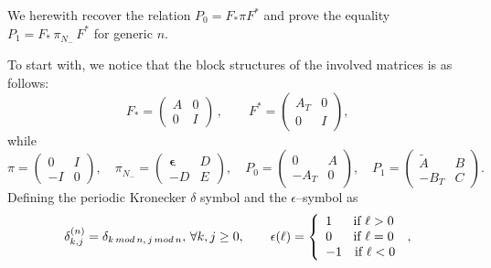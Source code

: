 \documentclass[12pt]{article}
\newcommand{\den}[2]{{{\delta^{(n)}_{#1,#2}}}}
\begin{document}
We herewith recover the relation $P_0=F_*\pi F^*$ and prove the equality $P_1=F_*\,\pi_{N_-}^{\phantom{\sharp}}\, F^*$ for generic $n$.

To start with, we notice that the block structures of the involved matrices is as follows:
\begin{equation}\label{blockF}
F_*=\left( \begin {array}{c|c} 
A & 0\\ 
\hline
0 & I
\end {array} \right)\, ,\qquad F^*=\left( \begin {array}{c|c} 
A_T & 0\\ 
\hline
0 & I
\end {array} \right),
\end{equation}
while
\begin{equation} \label{PP01} 
\pi=\left( \begin {array}{c|c} 
0& I\\ 
\hline
-I & 0
\end {array} \right)  
, \quad 
\pi_{N_-}^{\phantom{\sharp}}=
\left( \begin {array}{c|c} 
\boldsymbol{\epsilon} & D\\ 
\hline
-D & E
\end {array} \right)
,\quad
P_0=\left( \begin {array}{c|c} 
0 & A\\ 
\hline
-A_T & 0
\end {array} \right),\quad%
P_1=\left( \begin {array}{c|c} 
\widetilde{A}& B\\ 
\hline
-B_T & C
\end {array} \right).
\end{equation}
Defining the periodic Kronecker $\delta$ symbol and the $\epsilon$--symbol as
\begin{equation}
\label{perdelta}
\den{k}{j}=\delta_{k\,{\small mod}\,n,\,j\,{\small mod}\,n},\,\forall k,j\geq 0%
,
\qquad \epsilon(\ell)=\left\{
\begin{array}{l}
1 \quad\ \ \text{if } \ell>0\\
0 \quad\ \ \text{if } \ell=0\\
-1\quad \text{if } \ell<0
\end{array}\right.\, ,
\end{equation}
\end{document}
